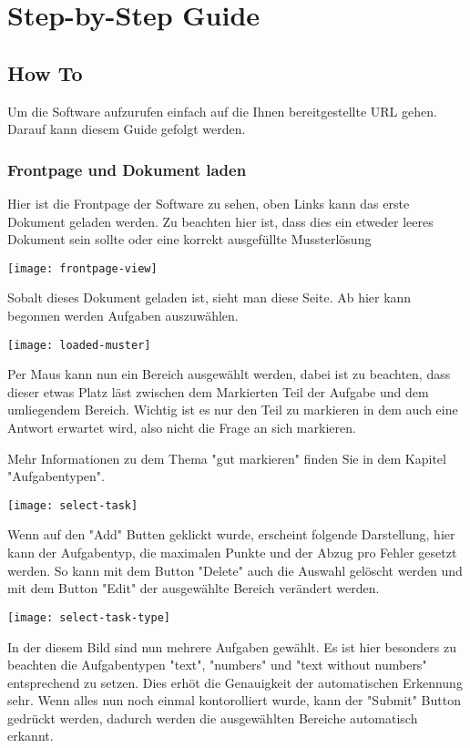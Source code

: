 \chapter{Step-by-Step Guide}

\section{How To}
Um die Software aufzurufen einfach auf die Ihnen bereitgestellte URL gehen.
Darauf kann diesem Guide gefolgt werden.

\subsection{Frontpage und Dokument laden}

Hier ist die Frontpage der Software zu sehen, oben Links kann das erste Dokument geladen werden.
Zu beachten hier ist, dass dies ein etweder leeres Dokument sein sollte oder eine korrekt ausgef\"ullte Mussterl\"osung

\texttt{[image: frontpage-view]}

Sobalt dieses Dokument geladen ist, sieht man diese Seite. 
Ab hier kann begonnen werden Aufgaben auszuw\"ahlen.

\texttt{[image: loaded-muster]}

Per Maus kann nun ein Bereich ausgew\"ahlt werden, dabei ist zu beachten, dass dieser etwas Platz l\"ast zwischen dem Markierten Teil der Aufgabe und dem umliegendem Bereich.
Wichtig ist es nur den Teil zu markieren in dem auch eine Antwort erwartet wird, also nicht die Frage an sich markieren.

Mehr Informationen zu dem Thema "gut markieren" finden Sie in dem Kapitel "Aufgabentypen".

\texttt{[image: select-task]}

Wenn auf den "Add" Butten geklickt wurde, erscheint folgende Darstellung, hier kann der Aufgabentyp, die maximalen Punkte und der Abzug pro Fehler gesetzt werden.
So kann mit dem Button "Delete" auch die Auswahl gel\"oscht werden und mit dem Button "Edit" der ausgew\"ahlte Bereich ver\"andert werden.

\texttt{[image: select-task-type]}

In der diesem Bild sind nun mehrere Aufgaben gew\"ahlt.
Es ist hier besonders zu beachten die Aufgabentypen "text", "numbers" und "text without numbers" entsprechend zu setzen.
Dies erh\"ot die Genauigkeit der automatischen Erkennung sehr.
Wenn alles nun noch einmal kontorolliert wurde, kann der "Submit" Button gedr\"uckt werden, dadurch werden die ausgew\"ahlten Bereiche automatisch erkannt.

